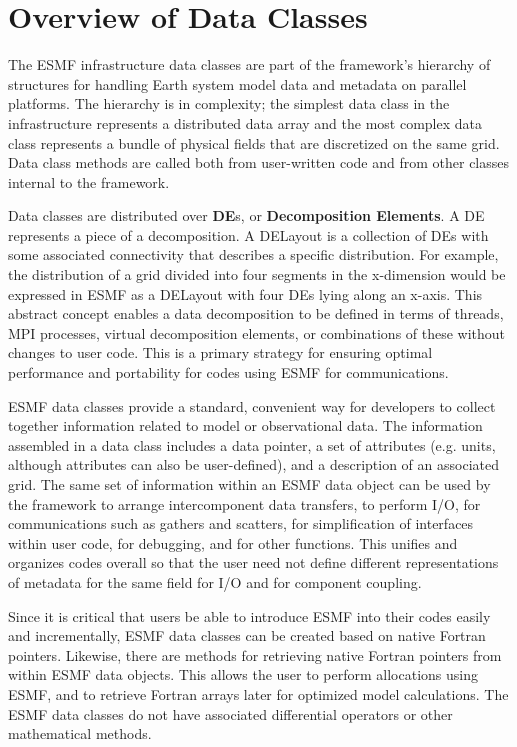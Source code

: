 
\section{Overview of Data Classes}

The ESMF infrastructure data classes are part of the framework's 
hierarchy of structures for handling Earth system model data and 
metadata on parallel platforms.  The hierarchy is in complexity; the 
simplest data class in the infrastructure represents a distributed data
array and the most complex data class represents a bundle of physical 
fields that are discretized on the same grid.  Data class methods 
are called both from user-written code and from other classes 
internal to the framework. 

Data classes are distributed over {\bf DE}s, or {\bf Decomposition Elements}.  
A DE represents a piece of a decomposition.  A DELayout is a collection
of DEs with some associated connectivity that describes a specific 
distribution.  For example, the distribution of a grid divided 
into four segments in the x-dimension would be expressed in ESMF as
a DELayout with four DEs lying along an x-axis. This abstract concept 
enables a data decomposition to be defined in 
terms of threads, MPI processes, virtual decomposition elements, or
combinations of these without changes to user code.  This is a
primary strategy for ensuring optimal performance and portability
for codes using ESMF for communications.

ESMF data classes provide a standard,
convenient way for developers to collect together information 
related to model or observational data.  The information assembled 
in a data class includes a data pointer, a set of attributes 
(e.g. units, although attributes can also be user-defined), and a 
description of an associated grid.  The same set of information within 
an ESMF data object can be used by the framework to arrange 
intercomponent data transfers, to perform I/O, for communications
such as gathers and scatters, for simplification of interfaces 
within user code, for debugging, and for other functions.  
This unifies and organizes codes overall so that the user need not
define different representations of metadata for the same field 
for I/O and for component coupling.  

Since it is critical that users be able to introduce ESMF into their
codes easily and incrementally, ESMF data classes can be created based 
on native Fortran pointers.  Likewise, there are methods for retrieving 
native Fortran pointers from within ESMF data objects.  This allows
the user to perform allocations using ESMF, and to retrieve Fortran
arrays later for optimized model calculations.  The ESMF data classes 
do not have associated differential operators or other mathematical 
methods.

